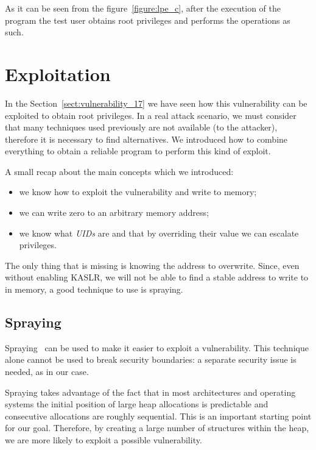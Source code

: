 \documentclass{masterthesis}
\newcommand{\refToSection}[1]{Section~\ref{sect:#1}\xspace}
\begin{document}
As it can be seen from the figure~\ref{figure:lpe_c}, after the execution of the program the test user obtains root privileges and performs the operations as such.

\section{Exploitation}
\label{sect:exp-cve}   
 
In the \refToSection{vulnerability_17} we have seen how this vulnerability can be exploited to obtain root privileges. In a real attack scenario, we must consider that many techniques used previously are not available (to the attacker), therefore it is necessary to find alternatives.
We introduced how to combine everything to obtain a reliable program to perform this kind of exploit.

A small recap about the main concepts which we introduced:
\begin{itemize}
   \item we know how to exploit the vulnerability and write to memory;
   \item we can write zero to an arbitrary memory address;
   \item we know what \emph{UIDs} are and that by overriding their value we can escalate privileges.
\end {itemize}

The only thing that is missing is knowing the address to overwrite.
Since, even without enabling KASLR, we will not be able to find a stable address to write to in memory, a good technique to use is spraying.

\subsection{Spraying}
\label{subsect:spraying}

Spraying~\cite{ratanaworabhan2009nozzle} can be used to make it easier to exploit a vulnerability. This technique alone cannot be used to break security boundaries: a separate security issue is needed, as in our case.

Spraying takes advantage of the fact that in most architectures and operating systems the initial position of large heap allocations is predictable and consecutive allocations are roughly sequential. This is an important starting point for our goal.
Therefore, by creating a large number of structures within the heap, we are more likely to exploit a possible vulnerability.
\end{document}
